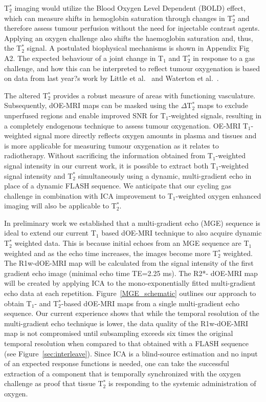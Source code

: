 T$_2^*$ imaging would utilize the Blood Oxygen Level Dependent (\acs{BOLD}) effect, which can measure shifts in hemoglobin saturation through changes in T$_2^*$ and therefore assess tumour perfusion without the need for injectable contrast agents. 
Applying an oxygen challenge also shifts the haemoglobin saturation and, thus, the T$_2^*$ signal. 
A postulated biophysical mechanisms is shown in Appendix Fig A2. 
The expected behaviour of a joint change in T$_1$ and T$_2^*$ in response to a gas challenge, and how this can be interpreted to reflect tumour oxygenation is based on data from last year?s work by Little et al.~\cite{Little:2018iu} and Waterton et al.~\cite{OConnor:2019fc}. 

The altered T$_2^*$ provides a robust measure of areas with functioning vasculature. 
Subsequently, \acs{dOE-MRI} maps can be masked using the $\Delta$T$_2^*$ maps to exclude unperfused regions and enable improved \acs{SNR} for T$_1$-weighted signals, resulting in a completely endogenous technique to assess tumour oxygenation. 
OE-MRI T$_1$-weighted signal more directly reflects oxygen amounts in plasma and tissues and is more applicable for measuring tumour oxygenation as it relates to radiotherapy.
Without sacrificing the information obtained from T$_1$-weighted signal intensity in our current work, it is possible to extract both T$_1$-weighted signal intensity and T$_2^*$ simultaneously using a dynamic, multi-gradient echo in place of a dynamic FLASH sequence. 
We anticipate that our cycling gas challenge in combination with \acs{ICA} improvement to T$_1$-weighted oxygen enhanced imaging will also be applicable to T$_2^*$.

In preliminary work we established that a multi-gradient echo (\acs{MGE}) sequence is ideal to extend our current T$_1$ based dOE-MRI technique to also acquire dynamic T$_2^*$ weighted data.
This is because initial echoes from an \acs{MGE} sequence are T$_1$ weighted and as the echo time increases, the images become more T$_2^*$ weighted. 
The R1w-dOE-MRI map will be calculated from the signal intensity of the first gradient echo image (minimal echo time TE=2.25 ms). 
The R2*- dOE-MRI map will be created by applying ICA to the mono-exponentially fitted multi-gradient echo data at each repetition. 
Figure~\ref{MGE_schematic} outlines our approach to obtain T$_1$- and T$_2^*$-based \acs{dOE-MRI} maps from a single multi-gradient echo sequence. 
Our current experience shows that while the temporal resolution of the multi-gradient echo technique is lower, the data quality of the R1w-dOE-MRI map is not compromised until subsampling exceeds six times the original temporal resolution when compared to that obtained with a \acs{FLASH} sequence (see Figure~\ref{sec:interleave}).
Since ICA is a blind-source estimation and no input of an expected response functions is needed, one can take the successful extraction of a component that is temporally synchronized with the oxygen challenge as proof that tissue T$_2^*$ is responding to the systemic administration of oxygen. 

